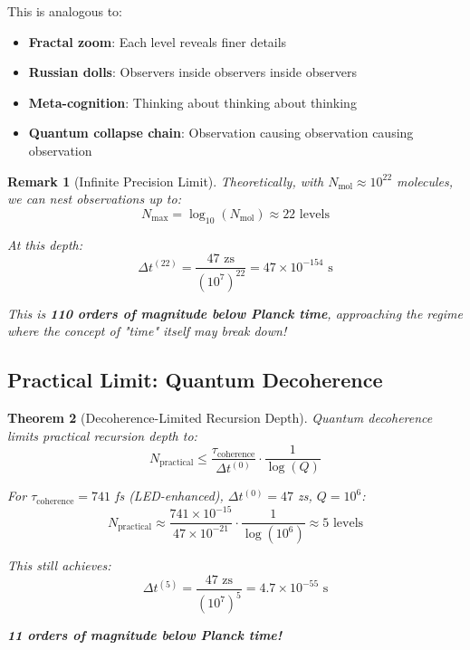 \documentclass[12pt,a4paper]{article}
\newtheorem{theorem}{Theorem}[section]
\newtheorem{remark}[theorem]{Remark}
\begin{document}
This is analogous to:
\begin{itemize}
\item \textbf{Fractal zoom}: Each level reveals finer details
\item \textbf{Russian dolls}: Observers inside observers inside observers
\item \textbf{Meta-cognition}: Thinking about thinking about thinking
\item \textbf{Quantum collapse chain}: Observation causing observation causing observation
\end{itemize}

\begin{remark}[Infinite Precision Limit]
Theoretically, with $N_{\text{mol}} \approx 10^{22}$ molecules, we can nest observations up to:
\begin{equation}
N_{\text{max}} = \log_{10}(N_{\text{mol}}) \approx 22 \text{ levels}
\end{equation}

At this depth:
\begin{equation}
\Delta t^{(22)} = \frac{47 \text{ zs}}{(10^7)^{22}} = 47 \times 10^{-154} \text{ s}
\end{equation}

This is \textbf{110 orders of magnitude below Planck time}, approaching the regime where the concept of "time" itself may break down!
\end{remark}

\subsection{Practical Limit: Quantum Decoherence}

\begin{theorem}[Decoherence-Limited Recursion Depth]
Quantum decoherence limits practical recursion depth to:
\begin{equation}
N_{\text{practical}} \leq \frac{\tau_{\text{coherence}}}{\Delta t^{(0)}} \cdot \frac{1}{\log(Q)}
\end{equation}

For $\tau_{\text{coherence}} = 741$ fs (LED-enhanced), $\Delta t^{(0)} = 47$ zs, $Q = 10^6$:
\begin{equation}
N_{\text{practical}} \approx \frac{741 \times 10^{-15}}{47 \times 10^{-21}} \cdot \frac{1}{\log(10^6)} \approx 5 \text{ levels}
\end{equation}

This still achieves:
\begin{equation}
\Delta t^{(5)} = \frac{47 \text{ zs}}{(10^7)^5} = 4.7 \times 10^{-55} \text{ s}
\end{equation}

\textbf{11 orders of magnitude below Planck time!}
\end{theorem}
\end{document}

